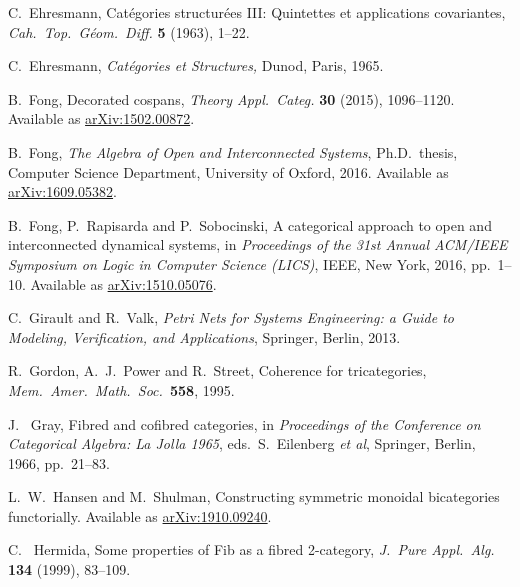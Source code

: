 \documentclass[reqno]{amsart}
\begin{document}
\begin{thebibliography}{100}
 C.\ Ehresmann, Cat\'egories structur\'ees III: Quintettes et applications covariantes,  \textsl{Cah.\ Top.\ G\'eom.\ Diff.} \textbf{5} (1963), 1--22.

 C.\ Ehresmann, {\sl Cat\'egories et Structures,} Dunod, Paris, 1965.

 B.\ Fong, Decorated cospans, \emph{Theory Appl.\ Categ.} \textbf{30} (2015), 1096--1120.  Available as \href{http://arxiv.org/abs/1502.00872}{arXiv:1502.00872}.

 B.\ Fong, \textsl{The Algebra of Open and Interconnected Systems},
Ph.D.\ thesis, Computer Science Department, University of Oxford, 2016.
Available as \href{https://arxiv.org/abs/1609.05382}{arXiv:1609.05382}.

 B.\ Fong, P.\ Rapisarda and P.\ Sobocinski, A categorical approach to open and interconnected dynamical systems, in \textsl{Proceedings of the 31st Annual ACM/IEEE Symposium on Logic in Computer Science (LICS)}, IEEE, New York, 2016, pp.\ 1--10.  Available as \href{http://arxiv.org/abs/510.05076}{arXiv:1510.05076}.

 C.\ Girault and R.\ Valk, \textsl{Petri Nets for Systems Engineering: a Guide to Modeling, Verification, and Applications}, Springer, Berlin, 2013.

 R.\ Gordon, A.\ J.\ Power and R.\ Street, Coherence for tricategories, \textsl{Mem.\ Amer.\ Math.\ Soc.\ }\textbf{558}, 1995.



 J. \ Gray, Fibred and cofibred categories, in \textsl{Proceedings of the Conference on Categorical Algebra: La Jolla 1965}, eds.\ S.\ Eilenberg \textit{et al}, Springer, Berlin, 1966, pp.\ 21--83.

  L.\ W.\ Hansen and M.\ Shulman, Constructing symmetric monoidal bicategories functorially.  Available as \href{https://arxiv.org/abs/1910.09240}{arXiv:1910.09240}.

 C. \ Hermida, Some properties of Fib as a fibred 2-category, \textsl{J.\ Pure Appl.\ Alg.\ } \textbf{134} (1999), 83--109.


\end{thebibliography}
\end{document}
